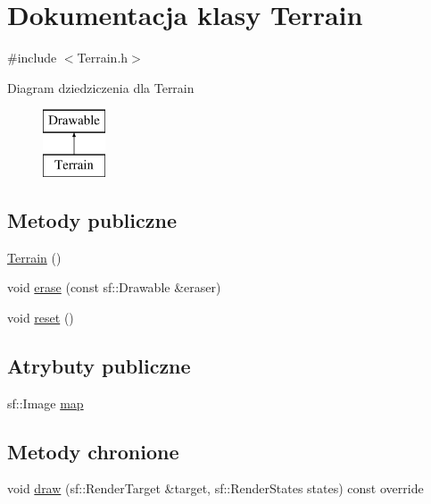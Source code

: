 \hypertarget{class_terrain}{}\section{Dokumentacja klasy Terrain}
\label{class_terrain}


{\ttfamily \#include $<$Terrain.\+h$>$}

Diagram dziedziczenia dla Terrain\begin{figure}[H]
\begin{center}
\leavevmode
\includegraphics[height=2.000000cm]{class_terrain}
\end{center}
\end{figure}
\subsection*{Metody publiczne}
\begin{DoxyCompactItemize}
\item 
\mbox{\hyperlink{class_terrain_a7160a06ab07a86ed97d23374405e8ef6}{Terrain}} ()
\item 
void \mbox{\hyperlink{class_terrain_a552c55d3ce93ae1c8988432acdf7aea1}{erase}} (const sf\+::\+Drawable \&eraser)
\item 
void \mbox{\hyperlink{class_terrain_a009d97df85f0704ad9ea3c61fcd11080}{reset}} ()
\end{DoxyCompactItemize}
\subsection*{Atrybuty publiczne}
\begin{DoxyCompactItemize}
\item 
sf\+::\+Image \mbox{\hyperlink{class_terrain_afda7533fb267038f082301a417691483}{map}}
\end{DoxyCompactItemize}
\subsection*{Metody chronione}
\begin{DoxyCompactItemize}
\item 
void \mbox{\hyperlink{class_terrain_a78fb38a85917a89fa9deb9eec9599b49}{draw}} (sf\+::\+Render\+Target \&target, sf\+::\+Render\+States states) const override
\end{DoxyCompactItemize}


